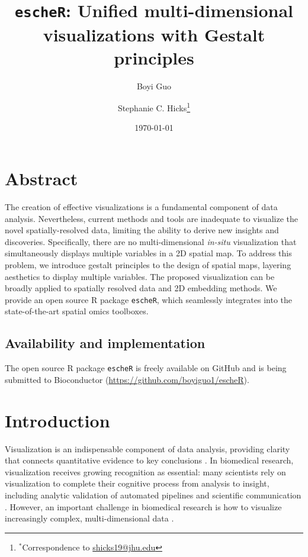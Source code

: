 \documentclass[10pt,twocolumn]{article}
\title{\texttt{escheR}: Unified multi-dimensional visualizations with Gestalt principles}
\author[1]{Boyi Guo}
\author[1,2]{Stephanie C. Hicks\thanks{$^*$Correspondence to \url{shicks19@jhu.edu}}}
\affil[1]{Department of Biostatistics, Johns Hopkins Bloomberg School of Public Health, MD, USA}
\affil[2]{Malone Center for Engineering in Healthcare, Johns Hopkins University, MD, USA}
\date{\today}
\newcommand{\fixme}[1]{{\color{red} (#1)}}
\begin{document}
\maketitle

\vspace{-.6in}

\section*{Abstract}
The creation of effective visualizations is a fundamental component of data analysis. Nevertheless, current methods and
tools are inadequate to visualize the novel spatially-resolved data, limiting the ability to derive new insights and discoveries. Specifically, there are no multi-dimensional \textit{in-situ} visualization that simultaneously displays multiple variables in a 2D spatial map. To address this problem, we introduce gestalt principles to the design of spatial maps, layering aesthetics to display multiple variables. The proposed visualization can be broadly applied to spatially resolved data and 2D embedding methods. We provide an open source R package \texttt{escheR}, which seamlessly integrates into the state-of-the-art spatial omics toolboxes.

\subsection*{Availability and implementation}
The open source R package \texttt{escheR} is freely available on GitHub and is being submitted to Bioconductor (\href{https://github.com/boyiguo1/escheR}{https://github.com/boyiguo1/escheR}).


\section{Introduction}
Visualization is an indispensable component of data analysis, providing clarity that connects quantitative evidence to key conclusions \cite{dagostinomcgowan_2022}. In biomedical research, visualization receives growing recognition as essential: many scientists rely on visualization to complete their cognitive process from analysis to insight, including analytic validation of automated pipelines and scientific communication \cite{odonoghue_2021}. However, an important challenge in biomedical research is how to visualize increasingly complex, multi-dimensional data \cite{odonoghue_2010}. 
\end{document}
